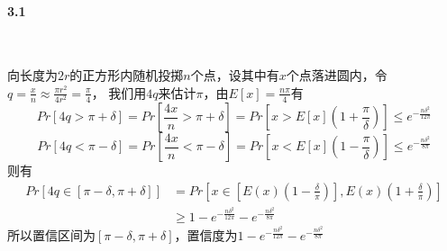\paragraph{3.1}~{}

向长度为$2r$的正方形内随机投掷$n$个点，设其中有$x$个点落进圆内，令$q=\frac{x}{n}\approx\frac{\pi r^2}{4r^2} = \frac{\pi}{4}$，
我们用$4q$来估计$\pi$，由$E[x] = \frac{n\pi}{4}$有
$$Pr[4q>\pi + \delta] = Pr[\frac{4x}{n} > \pi + \delta] = Pr[x > E[x](1+\frac{\pi}{\delta})] \le e^{-\frac{n\delta^2}{12\pi}}$$
$$Pr[4q<\pi - \delta] = Pr[\frac{4x}{n} < \pi - \delta] = Pr[x < E[x](1-\frac{\pi}{\delta})] \le e^{-\frac{n\delta^2}{8\pi}}$$
则有
$$
\begin{aligned}
    Pr[4q \in [\pi - \delta, \pi + \delta]]
    &= Pr[x \in [E(x)(1-\frac{\delta}{\pi})], E(x)(1+\frac{\delta}{\pi})] \\
    &\ge 1 - e^{-\frac{n\delta^2}{12\pi}} - e^{-\frac{n\delta^2}{8\pi}}
\end{aligned}
$$
所以置信区间为$[\pi - \delta, \pi + \delta]$，置信度为$1 - e^{-\frac{n\delta^2}{12\pi}} - e^{-\frac{n\delta^2}{8\pi}}$